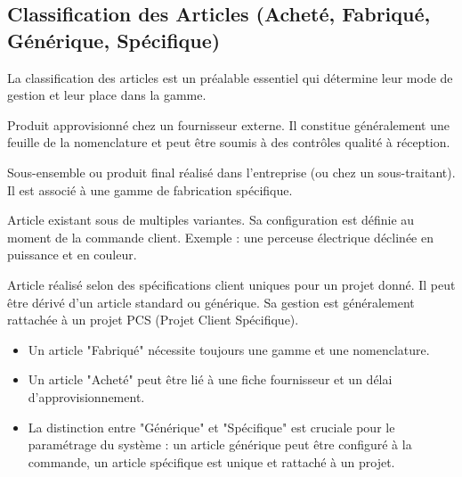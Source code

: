 \documentclass{article}
\begin{document}
\subsection{Classification des Articles (Acheté, Fabriqué, Générique, Spécifique)}

La classification des articles est un préalable essentiel qui détermine leur mode de gestion et leur place dans la gamme.

\begin{description}[font=\bfseries\color{blue!70!black}]
    \item[Article Acheté] Produit approvisionné chez un fournisseur externe. Il constitue généralement une feuille de la nomenclature et peut être soumis à des contrôles qualité à réception.
    
    \item[Article Fabriqué] Sous-ensemble ou produit final réalisé dans l'entreprise (ou chez un sous-traitant). Il est associé à une gamme de fabrication spécifique.
    
    \item[Article Générique] Article existant sous de multiples variantes. Sa configuration est définie au moment de la commande client. Exemple : une perceuse électrique déclinée en puissance et en couleur.
    
    \item[Article Spécifique] Article réalisé selon des spécifications client uniques pour un projet donné. Il peut être dérivé d'un article standard ou générique. Sa gestion est généralement rattachée à un projet PCS (Projet Client Spécifique).
\end{description}

\begin{tcolorbox}[colback=yellow!10!white, colframe=yellow!50!black, title=Conseils pratiques]
\begin{itemize}
    \item Un article "Fabriqué" nécessite toujours une gamme et une nomenclature.
    \item Un article "Acheté" peut être lié à une fiche fournisseur et un délai d'approvisionnement.
    \item La distinction entre "Générique" et "Spécifique" est cruciale pour le paramétrage du système : un article générique peut être configuré à la commande, un article spécifique est unique et rattaché à un projet.
\end{itemize}
\end{tcolorbox}
\end{document}

